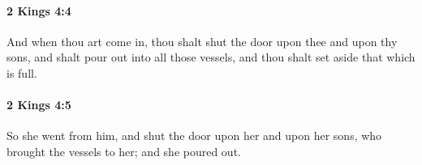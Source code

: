 		\paragraph{2 Kings 4:4} %
			\label{2KINGS-4-4}

			And when thou art come in, thou shalt shut the door upon thee and upon thy sons, and shalt pour out into all those vessels, and thou shalt set aside that which is full.


		\paragraph{2 Kings 4:5} %
			\label{2KINGS-4-5}

			So she went from him, and shut the door upon her and upon her sons, who brought the vessels to her; and she poured out.


